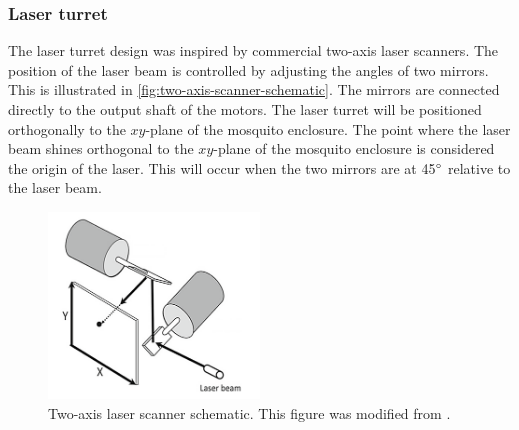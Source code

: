 \subsubsection{Laser turret}\label{subsubsec:laser_turret_design}
The laser turret design was inspired by commercial two-axis laser scanners. The position of the laser beam is controlled by adjusting the angles of two mirrors. This is illustrated in \autoref{fig:two-axis-scanner-schematic}. The mirrors are connected directly to the output shaft of the motors. The laser turret will be positioned orthogonally to the $xy$-plane of the mosquito enclosure. The point where the laser beam shines orthogonal to the $xy$-plane of the mosquito enclosure is considered the origin of the laser. This will occur when the two mirrors are at 45$^{\circ}$ relative to the laser beam.
\begin{figure}[!htb]
  \centering
  \includegraphics[width=0.5\textwidth]{figures/hardware_design/two_axis_scanner.png}
  \caption{Two-axis laser scanner schematic. This figure was modified from \cite{two-axis-scanner-schematic}.}
  \label{fig:two-axis-scanner-schematic}
\end{figure}

